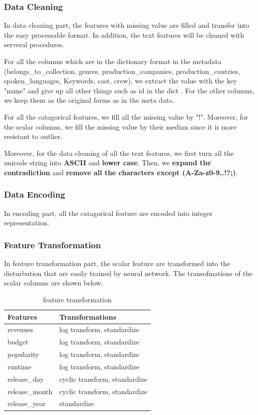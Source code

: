 \documentclass{article}
\begin{document}
\subsubsection{Data Cleaning}
	In data cleaning part, the features with missing value are filled and transfer into the easy processable format. In addition, the text features will be cleaned with serveral procedures.
	
	For all the columns which are in the dictionary format in the metadata (belongs\_to\_collection, genres, production\_companies, production\_coutries, spoken\_languages, Keywords, cast, crew), we extract the value with the key "name" and give up all other things such as id in the dict . For the other columns, we keep them as the original forms as in the meta data.
	
	For all the catagorical features, we fill all the missing value by "!". Moreover, for the scalar columns, we fill the missing value by their median since it is more resistant to  outlier.
	
	Moreover, for the data cleaning of all the text features, we first turn all the unicode string into \textbf{ASCII} and \textbf{lower case}. Then, we \textbf{expand the contradiction} and \textbf{remove all the characters except (A-Za-z0-9,.!?;)}.
	
\subsubsection{Data Encoding}
	In encoding part, all the catagorical feature are encoded into integer representation.

\subsubsection{Feature Transformation}
In feature transformation part, the scalar feature are transformed into the disturbution that are easily trained by neural network. The transofmations of the scalar columns are shown below.

\begin{table}[htb]
	\caption{feature transformation}
	\label{sample-table}
	\centering
	\begin{tabular}{ll}
		\toprule
		\cmidrule{1-2}
		Features &  Transformations \\
		\midrule
		revenues & log transform, standardize \\
		budget & log transform, standardize \\
		popularity & log transform, standardize \\
		runtime & log transform, standardize \\
		release\_day & cyclic transform, standardize \\
		release\_month & cyclic transform, standardize \\
		release\_year & standardize \\
	\end{tabular}
\end{table}
\end{document}
